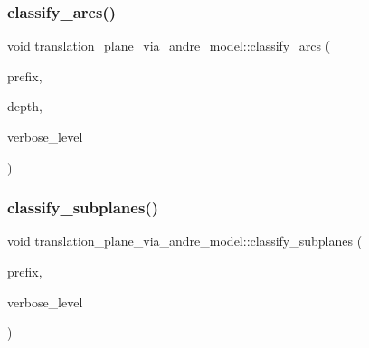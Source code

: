 \subsubsection{\texorpdfstring{classify\+\_\+arcs()}{classify\_arcs()}}
{\footnotesize\ttfamily void translation\+\_\+plane\+\_\+via\+\_\+andre\+\_\+model\+::classify\+\_\+arcs (\begin{DoxyParamCaption}\item[{const \mbox{\hyperlink{galois_8h_ab6cc7b4aeb6ea31aba2b3fbfc83ff5e6}{B\+Y\+TE}} $\ast$}]{prefix,  }\item[{\mbox{\hyperlink{galois_8h_a09fddde158a3a20bd2dcadb609de11dc}{I\+NT}}}]{depth,  }\item[{\mbox{\hyperlink{galois_8h_a09fddde158a3a20bd2dcadb609de11dc}{I\+NT}}}]{verbose\+\_\+level }\end{DoxyParamCaption})}

\mbox{\label{classtranslation__plane__via__andre__model_a794fefa95f0a7f7b887133375988ee55}} 
\subsubsection{\texorpdfstring{classify\+\_\+subplanes()}{classify\_subplanes()}}
{\footnotesize\ttfamily void translation\+\_\+plane\+\_\+via\+\_\+andre\+\_\+model\+::classify\+\_\+subplanes (\begin{DoxyParamCaption}\item[{const \mbox{\hyperlink{galois_8h_ab6cc7b4aeb6ea31aba2b3fbfc83ff5e6}{B\+Y\+TE}} $\ast$}]{prefix,  }\item[{\mbox{\hyperlink{galois_8h_a09fddde158a3a20bd2dcadb609de11dc}{I\+NT}}}]{verbose\+\_\+level }\end{DoxyParamCaption})}

\mbox{\label{classtranslation__plane__via__andre__model_a734ca0c38ef0fa02dc62ba1190dd75bc}} 
